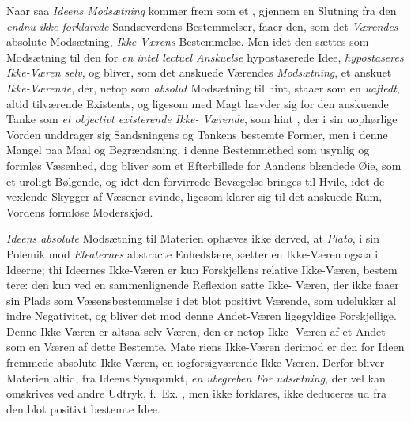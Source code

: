 Naar saa \emph{Ideens Modsætning} kommer frem som et
, gjennem en Slutning fra den \emph{endnu ikke
forklarede} Sandseverdens Bestemmelser, faaer den, som det
\emph{Værendes} absolute Modsætning, \emph{Ikke-Værens} Bestemmelse.
Men idet den sættes som Modsætning til den for \emph{en intel\-%
lectuel Anskuelse} hypostaserede Idee, \emph{hypostaseres
Ikke-Væren selv}, og bliver, som det anskuede Værendes
\emph{Modsætning}, et anskuet \emph{Ikke-Værende}, der, netop som
\emph{absolut} Modsætning til hint, staaer som en \emph{uafledt}, altid
tilværende Existents, og ligesom med Magt hævder sig for den
anskuende Tanke som \emph{et objectivt existerende Ikke-%
Værende}, som hint , der i sin uophørlige Vorden
unddrager sig Sandsningens og Tankens bestemte Former,
men i denne Mangel paa Maal og Begrændsning, i denne
Bestemmethed som usynlig og formløs Væsenhed, dog bliver
som et Efterbillede for Aandens blændede Øie, som et uroligt
Bølgende, og idet den forvirrede Bevægelse bringes til Hvile,
idet de vexlende Skygger af Væsener svinde, ligesom klarer
sig til det anskuede Rum, Vordens formløse Moderskjød.

\emph{Ideens absolute} Modsætning til Materien ophæves ikke
derved, at \emph{Plato}, i sin Polemik mod \emph{Eleaternes} abstracte
Enhedslære, sætter en Ikke-Væren ogsaa i Ideerne; thi Ideernes
Ikke-Væren er kun Forskjellens relative Ikke-Væren, bestem\-%
tere: den kun ved en sammenlignende Reflexion satte Ikke-%
Væren, der ikke faaer sin Plads som Væsensbestemmelse i det
blot positivt Værende, som udelukker al indre Negativitet, og
bliver det mod denne Andet-Væren ligegyldige Forskjellige.
Denne Ikke-Væren er altsaa selv Væren, den er netop Ikke-%
Væren af et Andet som en Væren af dette Bestemte. Mate\-%
riens Ikke-Væren derimod er den for Ideen fremmede absolute
Ikke-Væren, en iogforsigværende Ikke-Væren. Derfor bliver
Materien altid, fra Ideens Synspunkt, \emph{en ubegreben For\-%
udsætning}, der vel kan omskrives ved andre Udtryk, f.\ Ex.
, men ikke forklares, ikke deduceres ud fra den blot
positivt bestemte Idee.

